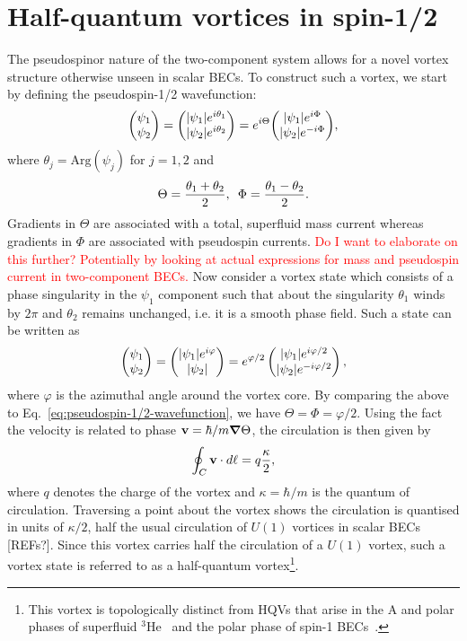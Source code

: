 \section{Half-quantum vortices in spin-1/2}
The pseudospinor nature of the two-component system allows for a novel vortex
structure otherwise unseen in scalar BECs.
To construct such a vortex, we start by defining the pseudospin-1/2
wavefunction:
\begin{equation}
    \mqty(\psi_1 \\ \psi_2) = 
    \mqty(|\psi_1|e^{i\theta_1} \\ |\psi_2|e^{i\theta_2}) = 
    e^{i\Theta}\mqty(|\psi_1|e^{i\Phi} \\ |\psi_2|e^{-i\Phi}),
    \label{eq:pseudospin-1/2-wavefunction}  
\end{equation}
where $\theta_j=\mathrm{Arg}(\psi_j)$ for $j=1,2$ and
\begin{equation}
    \Theta = \frac{\theta_1 + \theta_2}{2}, \enskip 
    \Phi = \frac{\theta_1 - \theta_2}{2}.
    \label{eq:Theta-Phi}
\end{equation}
Gradients in $\Theta$ are associated with a total, superfluid mass current
whereas gradients in $\Phi$ are associated with pseudospin currents.
\textcolor{red}{Do I want to elaborate on this further? Potentially by looking
at actual expressions for mass and pseudospin current in two-component BECs.}
Now consider a vortex state which consists of a phase singularity in the
$\psi_1$ component such that about the singularity $\theta_1$ winds by $2\pi$
and $\theta_2$ remains unchanged, i.e. it is a smooth phase field.
Such a state can be written as
\begin{equation}
    \begin{pmatrix}\psi_1\\\psi_2\end{pmatrix} 
    = \begin{pmatrix}|\psi_1|e^{i\varphi}\\|\psi_2|\end{pmatrix}
    = e^{\varphi/2}\begin{pmatrix}|\psi_1|e^{i\varphi/2}\\|\psi_2|e^{-i\varphi/2}\end{pmatrix},
\end{equation}
where $\varphi$ is the azimuthal angle around the vortex core.
By comparing the above to Eq.~\eqref{eq:pseudospin-1/2-wavefunction}, we have
$\Theta=\Phi=\varphi/2$.
Using the fact the velocity is related to phase $\vb{v}=\hbar/m\grad\Theta$,
the circulation is then given by
\begin{equation}
    \oint_C\vb{v}\cdot d\vb{\ell} = q\frac{\kappa}{2},
\end{equation}
where $q$ denotes the charge of the vortex and $\kappa=\hbar/m$ is the quantum
of circulation.
Traversing a point about the vortex shows the circulation is quantised in units
of $\kappa/2$, half the usual circulation of $U(1)$ vortices in scalar BECs [REFs?].
Since this vortex carries half the circulation of a $U(1)$ vortex, such a vortex
state is referred to as a half-quantum vortex\footnote{This vortex is 
topologically distinct from HQVs that arise in the A and polar phases of
superfluid $^3$He~\cite{Autti2016} and the polar phase of spin-1
BECs~\cite{Leonhardt2000, Seo2015}.}.

